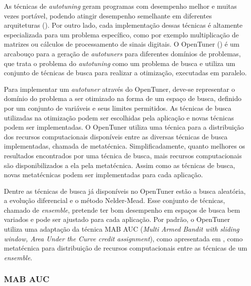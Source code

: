 \documentclass[a4paper, 12pt]{article}
\begin{document}
As técnicas de \emph{autotuning} geram programas com desempenho melhor e 
muitas vezes portável, podendo atingir desempenho semelhante em diferentes 
arquiteturas (\citet{demmel2009accelerating}). Por outro lado, cada 
implementação dessas técnicas é altamente especializada para um problema 
específico, como por exemplo multiplicação de matrizes ou cálculos de 
processamento de sinais digitais.
O OpenTuner (\citet{ansel2013opentuner}) é um arcabouço para a geração de 
\emph{autotuners} para diferentes domínios de problemas, que trata o problema
do \emph{autotuning} como um problema de busca e utiliza um conjunto de 
técnicas de busca para realizar a otimização, executadas em paralelo.

Para implementar um \emph{autotuner} através do OpenTuner, deve-se representar
o domínio do problema a ser otimizado na forma de um espaço de busca, definido 
por um conjunto de variáveis e seus limites permitidos. As técnicas de busca 
utilizadas na otimização podem ser escolhidas pela aplicação e novas técnicas
podem ser implementadas. O OpenTuner utiliza uma técnica para a 
distribuição dos recursos computacionais disponíveis entre as 
diversas técnicas de busca implementadas, chamada de metatécnica.
Simplificadamente, quanto melhores os resultados encontrados por uma técnica de
busca, mais recursos computacionais são disponibilizados a ela pela 
metatécnica. Assim como as técnicas de busca, novas metatécnicas podem ser 
implementadas para cada aplicação.

Dentre as técnicas de busca já disponíveis no OpenTuner estão a busca 
aleatória, a evolução diferencial e o método Nelder-Mead. Esse conjunto
de técnicas, chamado de \emph{ensemble}, pretende ter bom desempenho em espaços
de busca bem variados e pode ser ajustado para cada aplicação. Por padrão, o 
OpenTuner utiliza uma adaptação da técnica MAB AUC (\emph{Multi Armed Bandit 
with sliding window, Area Under the Curve credit assignment}), como apresentada
em \citet{pacula2012bandit}, como metatécnica para distribuição de recursos 
computacionais entre as técnicas de um \emph{ensemble}.

\subsubsection{MAB AUC}
\end{document}
